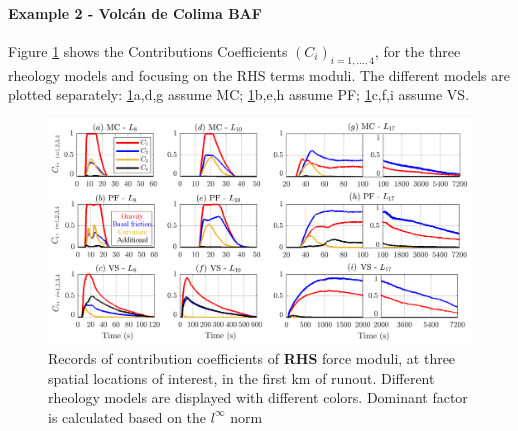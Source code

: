 \documentclass{article}
\begin{document}
\paragraph{Example 2 - Volc{\'a}n de Colima BAF}
Figure \ref{fig:Colima-Ci_1} shows the Contributions Coefficients $(C_i)_{i=1,\dots,4}$, for the three rheology models and focusing on the RHS terms moduli. The different models are plotted separately: \ref{fig:Colima-Ci_1}a,d,g assume MC; \ref{fig:Colima-Ci_1}b,e,h assume PF; \ref{fig:Colima-Ci_1}c,f,i assume VS.
\begin{figure}[H]
         \centering
        \includegraphics[width=1\textwidth]{BAF_VolcanDeColima/ForceContrib/Ci1_total.png}
        \caption{Records of contribution coefficients of \textbf{RHS} force moduli, at three spatial locations of interest, in the first km of runout. Different rheology models are displayed with different colors. Dominant factor is calculated based on the $l^\infty$ norm}
        \label{fig:Colima-Ci_1}
\end{figure}
\end{document}
